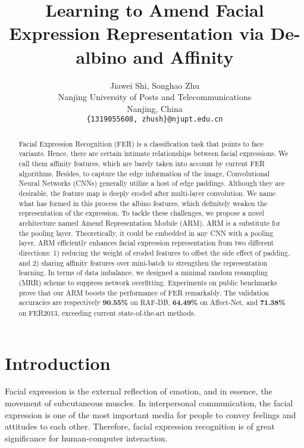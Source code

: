 \documentclass[10pt,twocolumn,letterpaper]{article}
\begin{document}
\title{Learning to Amend Facial Expression Representation via
De-albino and Affinity}

\author{Jiawei Shi, Songhao Zhu\\
Nanjing University of Posts and Telecommunications\\
Nanjing, China\\
{\tt\small \{1319055608, zhush\}@njupt.edu.cn}
}

\maketitle
\ificcvfinal\thispagestyle{empty}\fi

\begin{abstract}
  Facial Expression Recognition (FER) is a classification task that points to face variants. Hence, there are certain intimate relationships between facial expressions. We call them affinity features, which are barely taken into account by current FER algorithms. Besides, to capture the edge information of the image, Convolutional Neural Networks (CNNs) generally utilize a host of edge paddings. Although they are desirable, the feature map is deeply eroded after multi-layer convolution. We name what has formed in this process the albino features, which definitely weaken the representation of the expression. To tackle these challenges, we propose a novel architecture named Amend Representation Module (ARM). ARM is a substitute for the pooling layer. Theoretically, it could be embedded in any CNN with a pooling layer. ARM efficiently enhances facial expression representation from two different directions: 1) reducing the weight of eroded features to offset the side effect of padding, and 2) sharing affinity features over mini-batch to strengthen the representation learning. In terms of data imbalance, we designed a minimal random resampling (MRR) scheme to suppress network overfitting. Experiments on public benchmarks prove that our ARM boosts the performance of FER remarkably. The validation accuracies are respectively \textbf{90.55\%} on RAF-DB, \textbf{64.49\%} on Affect-Net, and \textbf{71.38\%} on FER2013, exceeding current state-of-the-art methods. 
\end{abstract}

\section{Introduction}

	Facial expression is the external reflection of emotion, and in essence, the movement of subcutaneous muscles. In interpersonal communication, the facial expression is one of the most important media for people to convey feelings and attitudes to each other. Therefore, facial expression recognition is of great significance for human-computer interaction. 
\end{document}
